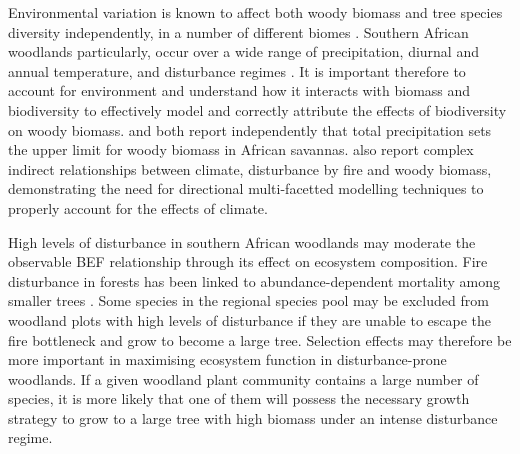 \documentclass[11pt,a4paper]{article}
\begin{document}
Environmental variation is known to affect both woody biomass and tree species diversity independently, in a number of different biomes \citep{Spasojevic2014, Michaletz2018, Michaletz2014}. Southern African woodlands particularly, occur over a wide range of precipitation, diurnal and annual temperature, and disturbance regimes \citep{Frost1996}. It is important therefore to account for environment and understand how it interacts with biomass and biodiversity to effectively model and correctly attribute the effects of biodiversity on woody biomass. \citet{Sankaran2005} and \citet{Lehmann2014} both report independently that total precipitation sets the upper limit for woody biomass in African savannas. \citet{Lehmann2014} also report complex indirect relationships between climate, disturbance by fire and woody biomass, demonstrating the need for directional multi-facetted modelling techniques to properly account for the effects of climate. 

High levels of disturbance in southern African woodlands may moderate the observable BEF relationship through its effect on ecosystem composition. Fire disturbance in forests has been linked to abundance-dependent mortality among smaller trees \citep{Roques2001, Staver2009, Bond2005}. Some species in the regional species pool may be excluded from woodland plots with high levels of disturbance if they are unable to escape the fire bottleneck and grow to become a large tree. Selection effects may therefore be more important in maximising ecosystem function in disturbance-prone woodlands. If a given woodland plant community contains a large number of species, it is more likely that one of them will possess the necessary growth strategy to grow to a large tree with high biomass under an intense disturbance regime. 
\end{document}
